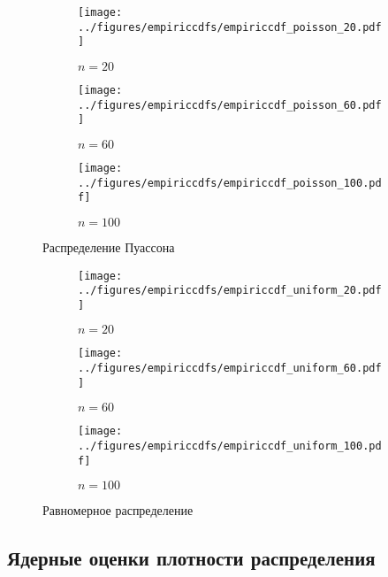 \documentclass[12pt]{article}
\begin{document}
	\begin{figure}[H]
		\centering
		\begin{subfigure}[t]{.3\linewidth}
			\centering\texttt{[image: ../figures/empiriccdfs/empiriccdf\_poisson\_20.pdf]}
			\caption*{$n = 20$}
		\end{subfigure}
		\begin{subfigure}[t]{.3\linewidth}
			\centering\texttt{[image: ../figures/empiriccdfs/empiriccdf\_poisson\_60.pdf]}
			\caption*{$n = 60$}
		\end{subfigure}
		\begin{subfigure}[t]{.3\linewidth}
			\centering\texttt{[image: ../figures/empiriccdfs/empiriccdf\_poisson\_100.pdf]}
			\caption*{$n = 100$}
		\end{subfigure}
		\caption{Распределение Пуассона}
	\end{figure}
	\begin{figure}[H]
		\centering
		\begin{subfigure}[t]{.3\linewidth}
			\centering\texttt{[image: ../figures/empiriccdfs/empiriccdf\_uniform\_20.pdf]}
			\caption*{$n = 20$}
		\end{subfigure}
		\begin{subfigure}[t]{.3\linewidth}
			\centering\texttt{[image: ../figures/empiriccdfs/empiriccdf\_uniform\_60.pdf]}
			\caption*{$n = 60$}
		\end{subfigure}
		\begin{subfigure}[t]{.3\linewidth}
			\centering\texttt{[image: ../figures/empiriccdfs/empiriccdf\_uniform\_100.pdf]}
			\caption*{$n = 100$}
		\end{subfigure}
		\caption{Равномерное распределение}
	\end{figure}

	\subsection{Ядерные оценки плотности распределения}
\end{document}
